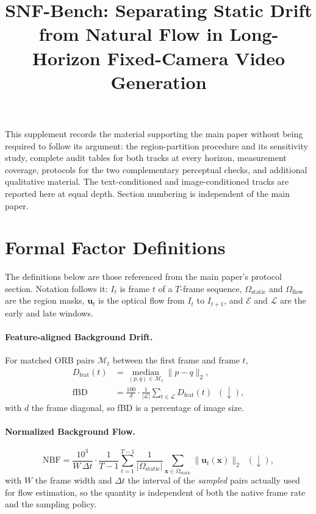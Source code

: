 \documentclass[10pt,twocolumn,letterpaper]{article}
\title{SNF-Bench: Separating Static Drift from Natural Flow in Long-Horizon Fixed-Camera Video Generation}
\begin{document}
\maketitlesupplementary


\noindent
This supplement records the material supporting the main paper without being
required to follow its argument: the region-partition procedure and its
sensitivity study, complete audit tables for both tracks at every horizon,
measurement coverage, protocols for the two complementary perceptual checks, and
additional qualitative material. The text-conditioned and image-conditioned
tracks are reported here at equal depth. Section numbering is independent of the
main paper.

\section{Formal Factor Definitions}
\label{sup:defs}

The definitions below are those referenced from the main paper's protocol
section. Notation follows it: $I_t$ is frame $t$ of a $T$-frame sequence,
$\Omega_{\mathrm{static}}$ and $\Omega_{\mathrm{flow}}$ are the region masks,
$\mathbf{u}_t$ is the optical flow from $I_t$ to $I_{t+1}$, and $\mathcal{E}$
and $\mathcal{L}$ are the early and late windows.

\paragraph{Feature-aligned Background Drift.}
For matched ORB pairs $\mathcal{M}_t$ between the first frame and frame $t$,
\begin{align}
D_{\mathrm{feat}}(t) &= \operatorname*{median}_{(p,q)\in\mathcal{M}_t} \lVert p-q \rVert_2, \nonumber\\
\mathrm{fBD} &= \frac{100}{d}\cdot\frac{1}{|\mathcal{L}|}\sum_{t\in\mathcal{L}} D_{\mathrm{feat}}(t) \;\;(\downarrow),
\end{align}
with $d$ the frame diagonal, so fBD is a percentage of image size.

\paragraph{Normalized Background Flow.}
\begin{equation}
\mathrm{NBF} = \frac{10^3}{W\,\Delta t}\cdot\frac{1}{T-1}\sum_{t=1}^{T-1}
\frac{1}{|\Omega_{\mathrm{static}}|}\sum_{\mathbf{x}\in\Omega_{\mathrm{static}}}
\lVert \mathbf{u}_t(\mathbf{x}) \rVert_2
\;\;(\downarrow),
\end{equation}
with $W$ the frame width and $\Delta t$ the interval of the \emph{sampled} pairs
actually used for flow estimation, so the quantity is independent of both the
native frame rate and the sampling policy.
\end{document}
